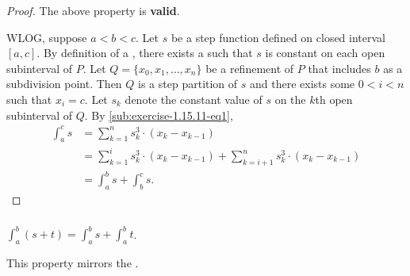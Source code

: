 \documentclass{report}
\begin{document}
  \begin{proof}
    The above property is \textbf{valid}.

    \vspace{6pt}

    WLOG, suppose $a < b < c$.
    Let $s$ be a step function defined on closed interval $[a, c]$.
    By definition of a , there exists a
       such that $s$ is constant on each open
      subinterval of $P$.
    Let $Q = \{x_0, x_1, \ldots, x_n\}$ be a refinement of $P$ that includes $b$
      as a subdivision point.
    Then $Q$ is a step partition of $s$ and there exists some $0 < i < n$ such
      that $x_i = c$.
    Let $s_k$ denote the constant value of $s$ on the $k$th open subinterval of
      $Q$.
    By \eqref{sub:exercise-1.15.11-eq1},
      \begin{align*}
        \int_a^c s
          & = \sum_{k=1}^n s_k^3 \cdot (x_k - x_{k-1}) \\
          & = \sum_{k=1}^i s_k^3 \cdot (x_k - x_{k-1}) +
              \sum_{k=i+1}^n s_k^3 \cdot (x_k - x_{k-1}) \\
          & = \int_a^b s + \int_b^c s.
      \end{align*}
  \end{proof}

\subsubsection{}%

  $\int_a^b (s + t) = \int_a^b s + \int_a^b t$.

  \begin{note}
    This property mirrors the .
  \end{note}
\end{document}
